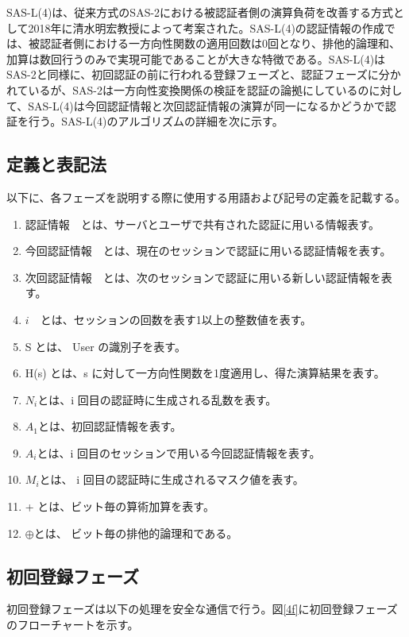 \documentclass{thesis}
\begin{document}
SAS-L(4)は、従来方式のSAS-2における被認証者側の演算負荷を改善する方式として2018年に清水明宏教授によって考案された。SAS-L(4)の認証情報の作成では、被認証者側における一方向性関数の適用回数は0回となり、排他的論理和、加算は数回行うのみで実現可能であることが大きな特徴である。SAS-L(4)はSAS-2と同様に、初回認証の前に行われる登録フェーズと、認証フェーズに分かれているが、SAS-2は一方向性変換関係の検証を認証の論拠にしているのに対して、SAS-L(4)は今回認証情報と次回認証情報の演算が同一になるかどうかで認証を行う。SAS-L(4)のアルゴリズムの詳細を次に示す。

\subsection{定義と表記法}
以下に、各フェーズを説明する際に使用する用語および記号の定義を記載する。
\begin{enumerate}[・]
				\item 認証情報　とは、サーバとユーザで共有された認証に用いる情報表す。
				\item 今回認証情報　とは、現在のセッションで認証に用いる認証情報を表す。
				\item 次回認証情報　とは、次のセッションで認証に用いる新しい認証情報を表す。
				\item $i$　とは、セッションの回数を表す1以上の整数値を表す。
				\item S とは、 User の識別子を表す。
				\item H(s) とは、s に対して一方向性関数を1度適用し、得た演算結果を表す。
				\item $N_i$とは、i 回目の認証時に生成される乱数を表す。
				\item $A_1$とは、初回認証情報を表す。
				\item $A_i$とは、i 回目のセッションで用いる今回認証情報を表す。
				\item $M_i$とは、 i 回目の認証時に生成されるマスク値を表す。
				\item + とは、ビット毎の算術加算を表す。
				\item $\oplus$とは、 ビット毎の排他的論理和である。
\end{enumerate}
\subsection{初回登録フェーズ}
初回登録フェーズは以下の処理を安全な通信で行う。図\ref{4f}に初回登録フェーズのフローチャートを示す。
\end{document}
